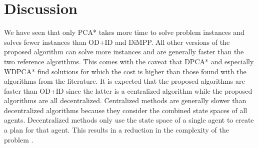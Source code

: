 \section{Discussion}\label{sec:discussion}


We have seen that only PCA* takes more time to solve problem instances and
solves fewer instances than OD+ID and DiMPP. All other versions of the proposed
algorithm can solve more
instances and are generally faster than the two reference algorithms. This
comes with the caveat that DPCA* and especially WDPCA* find solutions for which 
the cost is higher than those found with the algorithms from the literature. It 
is expected that the proposed algorithms are faster than OD+ID
since the latter is a centralized algorithm while the proposed algorithms are
all decentralized. Centralized methods are generally slower than decentralized
algorithms because they consider the combined state spaces
of all agents. Decentralized methods only use the state space of a single agent
to create a plan for that agent. This results in a reduction in the complexity
of the problem \cite{bennewitz2002,sharon2013}.

